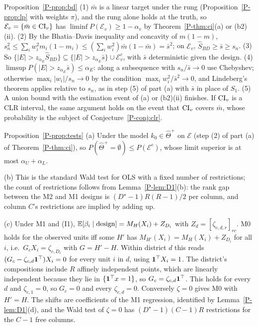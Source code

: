 \begin{proofof}{Proposition~\ref{P-prop:bd}}
(1) $\bar m$ is a linear target under the rung (Proposition~\ref{P-prop:lp} with weights
$\pi$), and the rung alone holds at the truth, so $\mathcal E_v=\{\bar m\in\mathrm{CI}_v\}$ has
$\liminf P(\mathcal E_v)\ge1-\alpha_v$ by Theorem~\ref{P-thm:ci}(a) or (b2)(ii).
(2) By the Bhatia--Davis inequality and concavity of $m(1-m)$,
$s_n^2\le\sum_iw_i^2m_i(1-m_i)\le(\sum_iw_i^2)\bar m(1-\bar m)=\bar s^2$; on $\mathcal E_v$,
$\hat S_{BD}\ge\bar s\ge s_n$.
(3) So $\{|E|>z_{\alpha_E}\hat S_{BD}\}\subseteq\{|E|>z_{\alpha_E}\bar s\}\cup\mathcal E_v^c$, with
$\bar s$ deterministic given the design.
(4) $\limsup P(|E|>z_{\alpha_E}\bar s)\le\alpha_E$: along a subsequence with
$s_n/\bar s\to0$ use Chebyshev; otherwise $\max_i|w_i|/s_n\to0$ by the condition
$\max_iw_i^2/\bar s^2\to0$, and Lindeberg's theorem applies relative to $s_n$, as in step
(5) of part (a) with $\bar s$ in place of $S_1$.
(5) A union bound with the estimation event of (a) or (b2)(ii) finishes.
If $\mathrm{CI}_v$ is a CLR interval, the same argument holds on the event that $\mathrm{CI}_v$ covers
$\bar m$, whose probability is the subject of Conjecture~\ref{P-conj:clr}.
\end{proofof}

\begin{proofof}{Proposition~\ref{P-prop:tests}}
(a) Under the model $k_0\in\hat\Theta^+$ on $\mathcal E$ (step (2) of part (a) of
Theorem~\ref{P-thm:ci}), so $P(\hat\Theta^+=\emptyset)\le P(\mathcal E^c)$, whose limit
superior is at most $\alpha_U+\alpha_L$.

(b) This is the standard Wald test for OLS with a fixed number of restrictions; the
count of restrictions follows from Lemma~\ref{P-lem:D1}(b): the rank gap between the M2
and M1 designs is $(D^\star-1)R(R-1)/2$ per column, and column $C$'s restrictions are
implied by adding up.

(c) Under M1 and (I1), $\mathbb E[\beta_i\mid\text{design}]=M_H(X_i)+Z_{D_i}$ with
$Z_d=[\zeta_{c,d,r}]_{rc}$. M0 holds for the observed units iff some $H'$ has
$M_{H'}(X_i)=M_H(X_i)+Z_{D_i}$ for all $i$, i.e.\ $G_cX_i=\zeta_{c,D_i}$ with $G=H'-H$.
Within district $d$ this reads $(G_c-\zeta_{c,d}\mathbf 1^\top)X_i=0$ for every unit $i$ in
$d$, using $\mathbf 1^\top X_i=1$. The district's compositions include $R$ affinely
independent points, which are linearly independent because they lie in
$\{\mathbf 1^\top x=1\}$, so $G_c=\zeta_{c,d}\mathbf 1^\top$. This holds for every $d$ and
$\zeta_{c,1}=0$, so $G_c=0$ and every $\zeta_{c,d}=0$. Conversely $\zeta=0$ gives M0 with
$H'=H$. The shifts are coefficients of the M1 regression, identified by
Lemma~\ref{P-lem:D1}(d), and the Wald test of $\zeta=0$ has $(D^\star-1)(C-1)R$
restrictions for the $C-1$ free columns.
\end{proofof}

